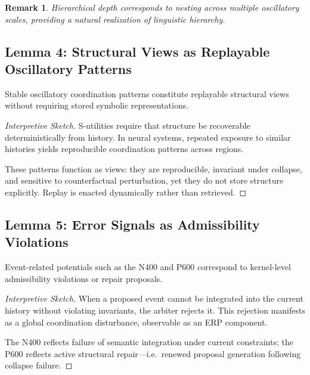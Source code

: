 \documentclass[11pt]{article}
\newtheorem{remark}{Remark}
\begin{document}
\begin{remark}
Hierarchical depth corresponds to nesting across multiple oscillatory scales, providing a natural realization of linguistic hierarchy.
\end{remark}

\subsection{Lemma 4: Structural Views as Replayable Oscillatory Patterns}

\begin{lemma}
\label{lem:views}
Stable oscillatory coordination patterns constitute replayable structural views without requiring stored symbolic representations.
\end{lemma}

\begin{proof}[Interpretive Sketch]
S-utilities require that structure be recoverable deterministically from history. In neural systems, repeated exposure to similar histories yields reproducible coordination patterns across regions.

These patterns function as views: they are reproducible, invariant under collapse, and sensitive to counterfactual perturbation, yet they do not store structure explicitly. Replay is enacted dynamically rather than retrieved.
\end{proof}

\subsection{Lemma 5: Error Signals as Admissibility Violations}

\begin{lemma}
\label{lem:erp_conflict}
Event-related potentials such as the N400 and P600 correspond to kernel-level admissibility violations or repair proposals.
\end{lemma}

\begin{proof}[Interpretive Sketch]
When a proposed event cannot be integrated into the current history without violating invariants, the arbiter rejects it. This rejection manifests as a global coordination disturbance, observable as an ERP component.

The N400 reflects failure of semantic integration under current constraints; the P600 reflects active structural repair—i.e.\ renewed proposal generation following collapse failure.
\end{proof}
\end{document}
